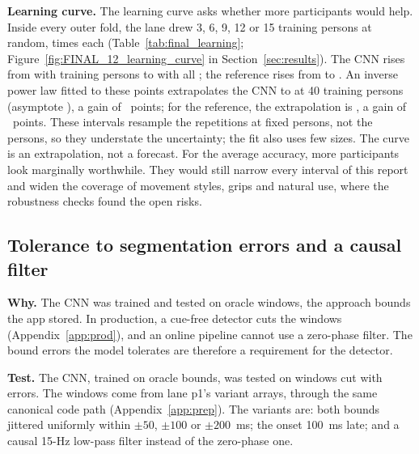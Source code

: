 \textbf{Learning curve.}
The learning curve asks whether more participants would help.
Inside every outer fold, the lane drew 3, 6, 9, 12 or 15 training persons at random,  times each (Table~\ref{tab:final_learning}; Figure~\ref{fig:FINAL_12_learning_curve} in Section~\ref{sec:results}).
The CNN rises from  with  training persons to  with all ; the reference rises from  to .
An inverse power law fitted to these points extrapolates the CNN to  at 40 training persons (asymptote ), a gain of ~points; for the reference, the extrapolation is , a gain of ~points.
These intervals resample the repetitions at fixed persons, not the persons, so they understate the uncertainty; the fit also uses few sizes.
The curve is an extrapolation, not a forecast.
For the average accuracy, more participants look marginally worthwhile.
They would still narrow every interval of this report and widen the coverage of movement styles, grips and natural use, where the robustness checks found the open risks.


\subsection{Tolerance to segmentation errors and a causal filter}\label{app:final:segmentation}

\textbf{Why.}
The CNN was trained and tested on oracle windows, the approach bounds the app stored.
In production, a cue-free detector cuts the windows (Appendix~\ref{app:prod}), and an online pipeline cannot use a zero-phase filter.
The bound errors the model tolerates are therefore a requirement for the detector.

\textbf{Test.}
The CNN, trained on oracle bounds, was tested on windows cut with errors.
The windows come from lane p1's variant arrays, through the same canonical code path (Appendix~\ref{app:prep}).
The variants are: both bounds jittered uniformly within $\pm 50$, $\pm 100$ or $\pm 200$~ms; the onset 100~ms late; and a causal 15-Hz low-pass filter instead of the zero-phase one.

